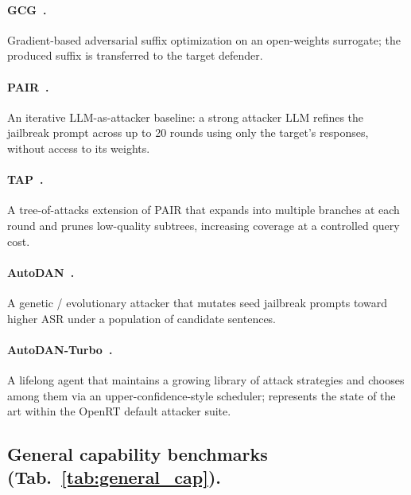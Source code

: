 \documentclass{article}
\begin{document}
\paragraph{GCG~\citep{zou2023universal}.} Gradient-based adversarial suffix optimization on an open-weights surrogate; the produced suffix is transferred to the target defender.

\paragraph{PAIR~\citep{chao2023pair}.} An iterative LLM-as-attacker baseline: a strong attacker LLM refines the jailbreak prompt across up to 20 rounds using only the target's responses, without access to its weights.

\paragraph{TAP~\citep{mehrotra2024tap}.} A tree-of-attacks extension of PAIR that expands into multiple branches at each round and prunes low-quality subtrees, increasing coverage at a controlled query cost.

\paragraph{AutoDAN~\citep{liu2023autodan}.} A genetic / evolutionary attacker that mutates seed jailbreak prompts toward higher ASR under a population of candidate sentences.

\paragraph{AutoDAN-Turbo~\citep{liu2024autodan}.} A lifelong agent that maintains a growing library of attack strategies and chooses among them via an upper-confidence-style scheduler; represents the state of the art within the OpenRT default attacker suite.

\subsection{General capability benchmarks (Tab.~\ref{tab:general_cap}).}
\label{apdx:bench-cap}

\end{document}

